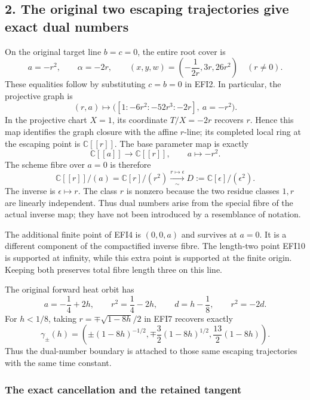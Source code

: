 \documentclass[
  10pt,
  a4paper,
]{article}
\begin{document}
\subsection{2. The original two escaping trajectories give exact dual
numbers}\label{the-original-two-escaping-trajectories-give-exact-dual-numbers}

On the original target line \(b=c=0\), the entire root cover is \[
a=-r^2,\qquad \alpha=-2r,
\qquad (x,y,w)=\left(-\frac1{2r},3r,26r^2\right)\quad(r\ne0).
\tag{EFI7}
\] These equalities follow by substituting \(c=b=0\) in EFI2. In
particular, the projective graph is \[
(r,a)\longmapsto
\bigl([1:-6r^2:-52r^3:-2r],\ a=-r^2\bigr).
\tag{EFI8}
\] In the projective chart \(X=1\), its coordinate \(T/X=-2r\) recovers
\(r\). Hence this map identifies the graph closure with the affine
\(r\)-line; its completed local ring at the escaping point is
\(\mathbb C[[r]]\). The base parameter map is exactly \[
\mathbb C[[a]]\longrightarrow\mathbb C[[r]],\qquad a\longmapsto-r^2.
\tag{EFI9}
\] The scheme fibre over \(a=0\) is therefore \[
\mathbb C[[r]]/(a)=\mathbb C[r]/(r^2)
\xrightarrow[\sim]{r\mapsto\epsilon}
D:=\mathbb C[\epsilon]/(\epsilon^2).
\tag{EFI10}
\] The inverse is \(\epsilon\mapsto r\). The class \(r\) is nonzero
because the two residue classes \(1,r\) are linearly independent. Thus
dual numbers arise from the special fibre of the actual inverse map;
they have not been introduced by a resemblance of notation.

The additional finite point of EFI4 is \((0,0,a)\) and survives at
\(a=0\). It is a different component of the compactified inverse fibre.
The length-two point EFI10 is supported at infinity, while this extra
point is supported at the finite origin. Keeping both preserves total
fibre length three on this line.

The original forward heat orbit has \[
a=-\frac14+2h,\qquad r^2=\frac14-2h,
\qquad d=h-\frac18,\qquad r^2=-2d.
\tag{EFI11}
\] For \(h<1/8\), taking \(r=\mp\sqrt{1-8h}/2\) in EFI7 recovers exactly
\[
\gamma_\pm(h)=
\left(\pm(1-8h)^{-1/2},
\mp\frac32(1-8h)^{1/2},\frac{13}2(1-8h)\right).
\tag{EFI12}
\] Thus the dual-number boundary is attached to those same escaping
trajectories with the same time constant.

\subsubsection{The exact cancellation and the retained
tangent}\label{the-exact-cancellation-and-the-retained-tangent}
\end{document}
